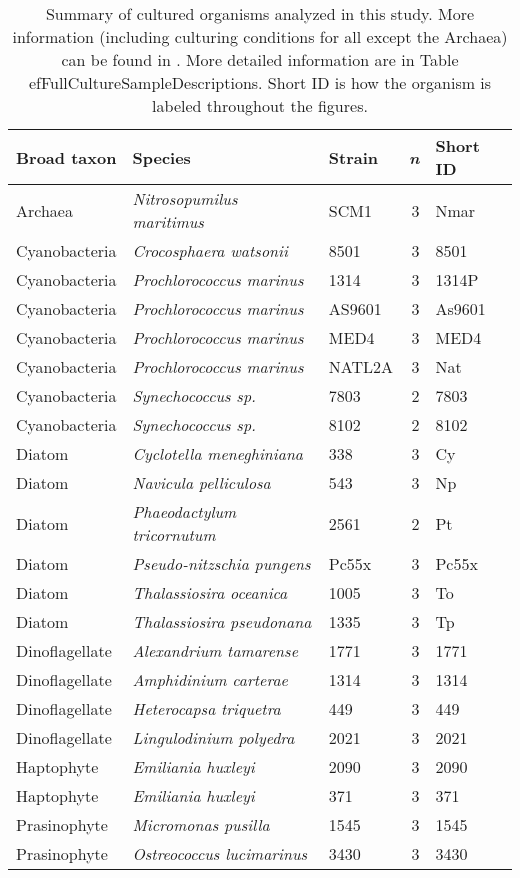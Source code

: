 \begin{table}[ht]
\centering
\begin{tabular}{lllrl}
  \hline
Broad taxon & Species & Strain & \textit{n} & Short ID \\ 
  \hline
Archaea & \textit{Nitrosopumilus maritimus} & SCM1 &   3 & Nmar \\ 
  Cyanobacteria & \textit{Crocosphaera watsonii} & 8501 &   3 & 8501 \\ 
  Cyanobacteria & \textit{Prochlorococcus marinus} & 1314 &   3 & 1314P \\ 
  Cyanobacteria & \textit{Prochlorococcus marinus} & AS9601 &   3 & As9601 \\ 
  Cyanobacteria & \textit{Prochlorococcus marinus} & MED4 &   3 & MED4 \\ 
  Cyanobacteria & \textit{Prochlorococcus marinus} & NATL2A &   3 & Nat \\ 
  Cyanobacteria & \textit{Synechococcus sp.} & 7803 &   2 & 7803 \\ 
  Cyanobacteria & \textit{Synechococcus sp.} & 8102 &   2 & 8102 \\ 
  Diatom & \textit{Cyclotella meneghiniana} & 338 &   3 & Cy \\ 
  Diatom & \textit{Navicula pelliculosa} & 543 &   3 & Np \\ 
  Diatom & \textit{Phaeodactylum tricornutum} & 2561 &   2 & Pt \\ 
  Diatom & \textit{Pseudo-nitzschia pungens} & Pc55x &   3 & Pc55x \\ 
  Diatom & \textit{Thalassiosira oceanica} & 1005 &   3 & To \\ 
  Diatom & \textit{Thalassiosira pseudonana} & 1335 &   3 & Tp \\ 
  Dinoflagellate & \textit{Alexandrium tamarense} & 1771 &   3 & 1771 \\ 
  Dinoflagellate & \textit{Amphidinium carterae} & 1314 &   3 & 1314 \\ 
  Dinoflagellate & \textit{Heterocapsa triquetra} & 449 &   3 & 449 \\ 
  Dinoflagellate & \textit{Lingulodinium polyedra} & 2021 &   3 & 2021 \\ 
  Haptophyte & \textit{Emiliania huxleyi} & 2090 &   3 & 2090 \\ 
  Haptophyte & \textit{Emiliania huxleyi} & 371 &   3 & 371 \\ 
  Prasinophyte & \textit{Micromonas pusilla} & 1545 &   3 & 1545 \\ 
  Prasinophyte & \textit{Ostreococcus lucimarinus} & 3430 &   3 & 3430 \\ 
   \hline
\end{tabular}
\caption{\label{CultureSampleDescriptions}Summary of cultured organisms analyzed in this study. More information (including culturing conditions for all except the Archaea) can be found in \cite{Durham2019}. More detailed information are in Table 
ef{FullCultureSampleDescriptions}. Short ID is how the organism is labeled throughout the figures.} 
\end{table}

